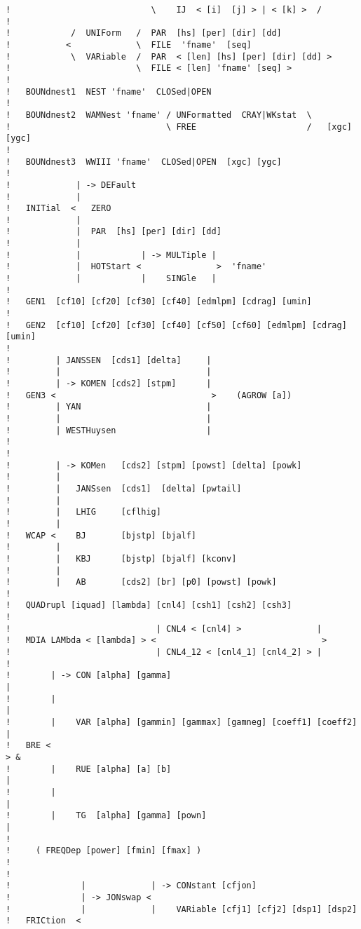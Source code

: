 \documentclass[12pt]{book}
\begin{document}
\begin{verbatim}
!                            \    IJ  < [i]  [j] > | < [k] >  /
!
!            /  UNIForm   /  PAR  [hs] [per] [dir] [dd]
!           <             \  FILE  'fname'  [seq]
!            \  VARiable  /  PAR  < [len] [hs] [per] [dir] [dd] >
!                         \  FILE < [len] 'fname' [seq] >
!
!   BOUNdnest1  NEST 'fname'  CLOSed|OPEN
!
!   BOUNdnest2  WAMNest 'fname' / UNFormatted  CRAY|WKstat  \
!                               \ FREE                      /   [xgc] [ygc]
!
!   BOUNdnest3  WWIII 'fname'  CLOSed|OPEN  [xgc] [ygc]
!
!             | -> DEFault
!             |
!   INITial  <   ZERO
!             |
!             |  PAR  [hs] [per] [dir] [dd]
!             |
!             |            | -> MULTiple |
!             |  HOTStart <               >  'fname'
!             |            |    SINGle   |
!
!   GEN1  [cf10] [cf20] [cf30] [cf40] [edmlpm] [cdrag] [umin]
!
!   GEN2  [cf10] [cf20] [cf30] [cf40] [cf50] [cf60] [edmlpm] [cdrag] [umin]
!
!         | JANSSEN  [cds1] [delta]     |
!         |                             |
!         | -> KOMEN [cds2] [stpm]      |
!   GEN3 <                               >    (AGROW [a])
!         | YAN                         |
!         |                             |
!         | WESTHuysen                  |
!
!
!         | -> KOMen   [cds2] [stpm] [powst] [delta] [powk]
!         |
!         |   JANSsen  [cds1]  [delta] [pwtail]
!         |
!         |   LHIG     [cflhig]
!         |
!   WCAP <    BJ       [bjstp] [bjalf]
!         |
!         |   KBJ      [bjstp] [bjalf] [kconv]
!         |
!         |   AB       [cds2] [br] [p0] [powst] [powk]
!
!   QUADrupl [iquad] [lambda] [cnl4] [csh1] [csh2] [csh3]
!
!                             | CNL4 < [cnl4] >               |
!   MDIA LAMbda < [lambda] > <                                 >
!                             | CNL4_12 < [cnl4_1] [cnl4_2] > |
!
!        | -> CON [alpha] [gamma]                                      |
!        |                                                             |
!        |    VAR [alpha] [gammin] [gammax] [gamneg] [coeff1] [coeff2] |
!   BRE <                                                               > &
!        |    RUE [alpha] [a] [b]                                      |
!        |                                                             |
!        |    TG  [alpha] [gamma] [pown]                               |
!
!     ( FREQDep [power] [fmin] [fmax] )
!
!
!              |             | -> CONstant [cfjon]
!              | -> JONswap <
!              |             |    VARiable [cfj1] [cfj2] [dsp1] [dsp2]
!   FRICtion  <

\end{verbatim}
\end{document}
